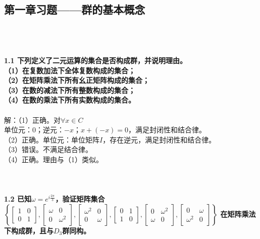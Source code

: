 \documentclass[12pt]{article}
\numberwithin{equation}{section}	 %
\begin{document}
\begin{spacing}{1.5}			%


\newcommand*{\dif}{\mathop{}\!\mathrm{d}} 		%


\newpage
\setcounter{page}{1}			%
\section{第一章习题——群的基本概念}
~\\
~\\
~\\
\textbf{1.1 \quad 下列定义了二元运算的集合是否构成群，并说明理由。\\
（1）在复数加法下全体复数构成的集合；\\
（2）在矩阵乘法下所有幺正矩阵构成的集合；\\
（3）在数的减法下所有整数构成的集合；\\
（4）在数的乘法下所有实数构成的集合。}\\
~\\
解：（1）正确。对$\forall x \in C$\\
单位元：$0$；逆元：$-x$；$x+(-x)=0$，满足封闭性和结合律。\\
（2）正确。单位元：单位矩阵$I$，存在逆元，满足封闭性和结合律。\\
（3）错误。不满足结合律。\\
（4）正确。理由与（1）类似。\\
~\\
~\\
~\\
\textbf{1.2 \quad 已知$\displaystyle \omega=e^{i\frac{2\pi}{3}}$，验证矩阵集合$\displaystyle \left\{ \begin{bmatrix} 1 & 0 \\ 0 & 1 \end{bmatrix} , \begin{bmatrix} \omega & 0 \\ 0 & \omega^{2} \end{bmatrix} ,\begin{bmatrix} \omega^{2} & 0 \\ 0 & \omega \end{bmatrix} , \begin{bmatrix} 0 & 1 \\ 1 & 0 \end{bmatrix} , \begin{bmatrix} 0 & \omega^{2} \\ \omega & 0 \end{bmatrix} , \begin{bmatrix} 0 & \omega \\ \omega^{2} & 0 \end{bmatrix} \right\}$ 在矩阵乘法下构成群，且与$D_{3}$群同构。}\\

\end{spacing}
\end{document}
